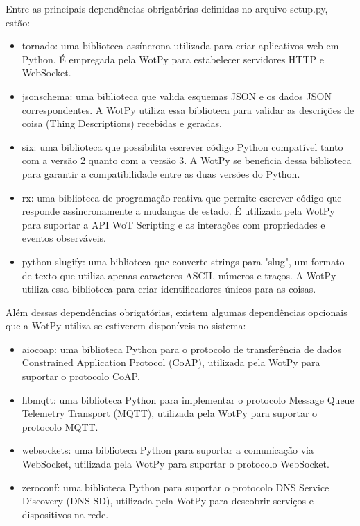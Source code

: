 Entre as principais dependências obrigatórias definidas no arquivo setup.py, estão:

\begin{itemize}
    \item tornado: uma biblioteca assíncrona utilizada para criar aplicativos web em Python. É empregada pela WotPy para estabelecer servidores HTTP e WebSocket.
    \item jsonschema: uma biblioteca que valida esquemas JSON e os dados JSON correspondentes. A WotPy utiliza essa biblioteca para validar as descrições de coisa (Thing Descriptions) recebidas e geradas.
    \item six: uma biblioteca que possibilita escrever código Python compatível tanto com a versão 2 quanto com a versão 3. A WotPy se beneficia dessa biblioteca para garantir a compatibilidade entre as duas versões do Python.
    \item rx: uma biblioteca de programação reativa que permite escrever código que responde assincronamente a mudanças de estado. É utilizada pela WotPy para suportar a API WoT Scripting e as interações com propriedades e eventos observáveis.
    \item python-slugify: uma biblioteca que converte strings para "slug", um formato de texto que utiliza apenas caracteres ASCII, números e traços. A WotPy utiliza essa biblioteca para criar identificadores únicos para as coisas.
\end{itemize}

Além dessas dependências obrigatórias, existem algumas dependências opcionais que a WotPy utiliza se estiverem disponíveis no sistema:

\begin{itemize}
    \item aiocoap: uma biblioteca Python para o protocolo de transferência de dados Constrained Application Protocol (CoAP), utilizada pela WotPy para suportar o protocolo CoAP.
    \item hbmqtt: uma biblioteca Python para implementar o protocolo Message Queue Telemetry Transport (MQTT), utilizada pela WotPy para suportar o protocolo MQTT.
    \item websockets: uma biblioteca Python para suportar a comunicação via WebSocket, utilizada pela WotPy para suportar o protocolo WebSocket.
    \item zeroconf: uma biblioteca Python para suportar o protocolo DNS Service Discovery (DNS-SD), utilizada pela WotPy para descobrir serviços e dispositivos na rede.
\end{itemize}

